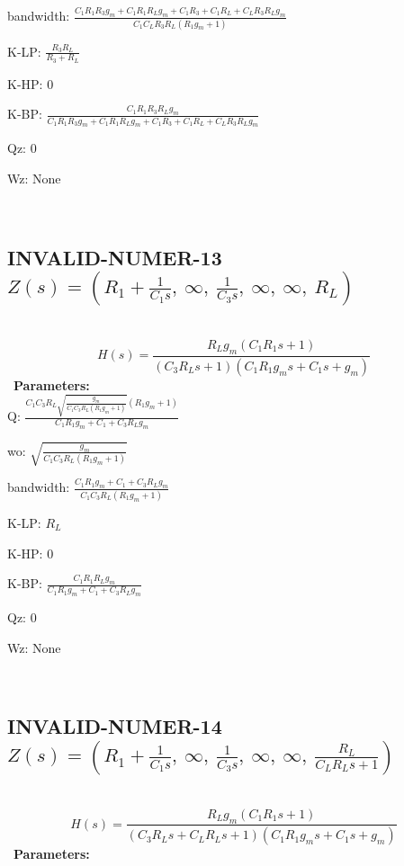 \documentclass{article}
\begin{document}
bandwidth: $\frac{C_{1} R_{1} R_{3} g_{m} + C_{1} R_{1} R_{L} g_{m} + C_{1} R_{3} + C_{1} R_{L} + C_{L} R_{3} R_{L} g_{m}}{C_{1} C_{L} R_{3} R_{L} \left(R_{1} g_{m} + 1\right)}$\ 

K-LP: $\frac{R_{3} R_{L}}{R_{3} + R_{L}}$\ 

K-HP: $0$\ 

K-BP: $\frac{C_{1} R_{1} R_{3} R_{L} g_{m}}{C_{1} R_{1} R_{3} g_{m} + C_{1} R_{1} R_{L} g_{m} + C_{1} R_{3} + C_{1} R_{L} + C_{L} R_{3} R_{L} g_{m}}$\ 

Qz: $0$\ 

Wz: $\text{None}$\ 

\ 

\subsection{INVALID-NUMER-13 $Z(s) = \left( R_{1} + \frac{1}{C_{1} s}, \  \infty, \  \frac{1}{C_{3} s}, \  \infty, \  \infty, \  R_{L}\right)$ } \ 
\textbf{\[H(s) = \frac{R_{L} g_{m} \left(C_{1} R_{1} s + 1\right)}{\left(C_{3} R_{L} s + 1\right) \left(C_{1} R_{1} g_{m} s + C_{1} s + g_{m}\right)}\] } \ 
\textbf{Parameters:}\\ 

Q: $\frac{C_{1} C_{3} R_{L} \sqrt{\frac{g_{m}}{C_{1} C_{3} R_{L} \left(R_{1} g_{m} + 1\right)}} \left(R_{1} g_{m} + 1\right)}{C_{1} R_{1} g_{m} + C_{1} + C_{3} R_{L} g_{m}}$\ 

wo: $\sqrt{\frac{g_{m}}{C_{1} C_{3} R_{L} \left(R_{1} g_{m} + 1\right)}}$\ 

bandwidth: $\frac{C_{1} R_{1} g_{m} + C_{1} + C_{3} R_{L} g_{m}}{C_{1} C_{3} R_{L} \left(R_{1} g_{m} + 1\right)}$\ 

K-LP: $R_{L}$\ 

K-HP: $0$\ 

K-BP: $\frac{C_{1} R_{1} R_{L} g_{m}}{C_{1} R_{1} g_{m} + C_{1} + C_{3} R_{L} g_{m}}$\ 

Qz: $0$\ 

Wz: $\text{None}$\ 

\ 

\subsection{INVALID-NUMER-14 $Z(s) = \left( R_{1} + \frac{1}{C_{1} s}, \  \infty, \  \frac{1}{C_{3} s}, \  \infty, \  \infty, \  \frac{R_{L}}{C_{L} R_{L} s + 1}\right)$ } \ 
\textbf{\[H(s) = \frac{R_{L} g_{m} \left(C_{1} R_{1} s + 1\right)}{\left(C_{3} R_{L} s + C_{L} R_{L} s + 1\right) \left(C_{1} R_{1} g_{m} s + C_{1} s + g_{m}\right)}\] } \ 
\textbf{Parameters:}\\ 
\end{document}
